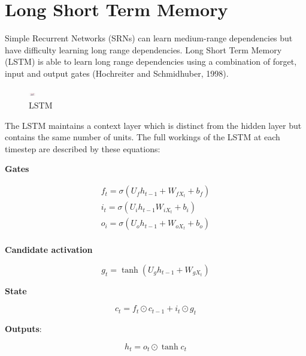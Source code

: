 \documentclass[11pt]{article}
\begin{document}
\section{Long Short Term Memory}\label{sec:long-short-term-memory}

Simple Recurrent Networks (SRNs) can learn medium-range dependencies but have difficulty learning long range dependencies.
Long Short Term Memory (LSTM) is able to learn long range dependencies using a combination of forget, input and output gates (Hochreiter and Schmidhuber, 1998).

\begin{figure}[h]
    \centering
    \includegraphics[width=12,height=8]{../out/images/lstm}
    \caption[LSTM]{LSTM}
    \label{fig: LSTM}
\end{figure}

The LSTM maintains a context layer which is distinct from the hidden layer but contains the same number of units.
The full workings of the LSTM at each timestep are described by these equations:

\textbf{Gates}

\begin{gather*}
    f_t = \sigma (U_f h_{t-1} + W_{f X_t} + b_f)\\
    i_t = \sigma(U_i h_{t-1} W_{i X_t} + b_i)\\
    o_i = \sigma(U_o h_{t-1} + W_{o X_t} + b_o)\\
\end{gather*}

\textbf{Candidate activation}

\[g_t = \tanh (U_g h_{t-1} + W_{g X_t})\]

\textbf{State}

\[c_t = f_t \odot c_{t-1} + i_t \odot g_t\]

\textbf{Outputs}:

\[h_t = o_t \odot \tanh c_t\]
\end{document}
